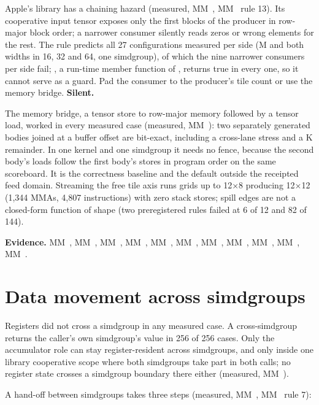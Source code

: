 Apple's library has a chaining hazard (measured, MM~, MM~ rule 13). Its cooperative input tensor exposes only the
first  blocks of the producer in row-major block order; a narrower consumer silently reads
zeros or wrong elements for the rest. The rule predicts all 27 configurations measured per side (M and both widths in 16, 32
and 64, one simdgroup), of which the nine narrower consumers per side fail; , a run-time
member function of , returns true in every one, so it cannot serve as a guard. Pad the consumer to the producer's tile count or use the memory bridge. \textbf{Silent.}

The memory bridge, a tensor store to row-major memory followed by a tensor load, worked in every measured case
(measured, MM~): two separately generated bodies joined at a buffer offset are bit-exact, including a
cross-lane stress and a K remainder. In one kernel and one simdgroup it needs no fence, because the second body's
loads follow the first body's stores in program order on the same scoreboard. It is the correctness baseline and the
default outside the receipted feed domain. Streaming the free tile axis runs grids up to 12×8 producing 12×12 (1,344
MMAs, 4,807 instructions) with zero stack stores; spill edges are not a closed-form function of shape (two
preregistered rules failed at 6 of 12 and 82 of 144).

\textbf{Evidence.} MM~, MM~, MM~, MM~, MM~, MM~, MM~, MM~, MM~, MM~,
MM~.

\section{Data movement across simdgroups}\label{sec:across-simdgroups}

Registers did not cross a simdgroup in any measured case. A cross-simdgroup  returns the caller's own simdgroup's value in
256 of 256 cases. Only the accumulator role can stay register-resident across simdgroups, and only inside one library
cooperative scope where both simdgroups take part in both calls; no register state crosses a simdgroup boundary there
either (measured, MM~).

A hand-off between simdgroups takes three steps (measured, MM~, MM~ rule 7):

